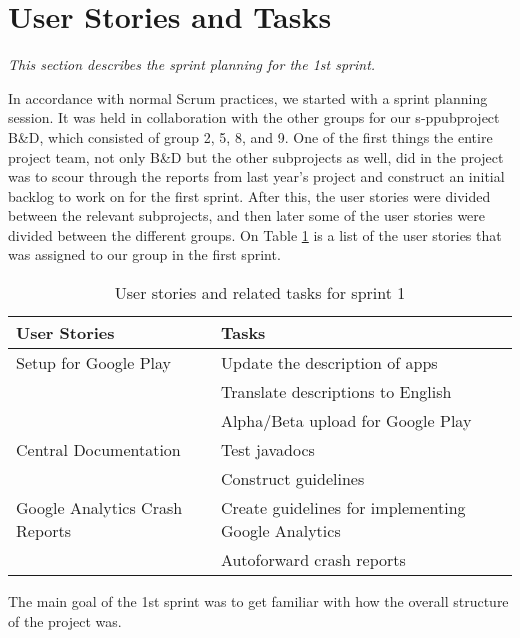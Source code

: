 \section{User Stories and Tasks} \label{Sprint1_SecUserStoriesAndTasks}
\textit{This section describes the sprint planning for the 1st sprint.}

In accordance with normal Scrum practices, we started with a sprint planning session. It was held in collaboration with the other groups for our s-ppubproject B\&D, which consisted of group 2, 5, 8, and 9. One of the first things the entire project team, not only B\&D but the other subprojects as well, did in the project was to scour through the reports from last year's project and construct an initial backlog to work on for the first sprint.
After this, the user stories were divided between the relevant subprojects, and then later some of the user stories were divided between the different groups. On Table \ref{Sprint1_UserStories2_table} is a list of the user stories that was assigned to our group in the first sprint.

\begin{table}[H]
	\centering
	\begin{tabular}{ll}
		\textbf{User Stories} & \textbf{Tasks}\\ \hline \noalign{\vskip 2mm}
		Setup for Google Play & Update the description of apps\\
		& Translate descriptions to English\\
		& Alpha/Beta upload for Google Play\\ \hline
		Central Documentation & Test javadocs\\
		& Construct guidelines\\ \hline
		Google Analytics Crash Reports & Create guidelines for implementing Google Analytics\\
		& Autoforward crash reports\\ \hline
	\end{tabular}
	\caption{User stories and related tasks for sprint 1}
	\label{Sprint1_UserStories2_table}
\end{table}

The main goal of the 1st sprint was to get familiar with how the overall structure of the project was.
\newpage
